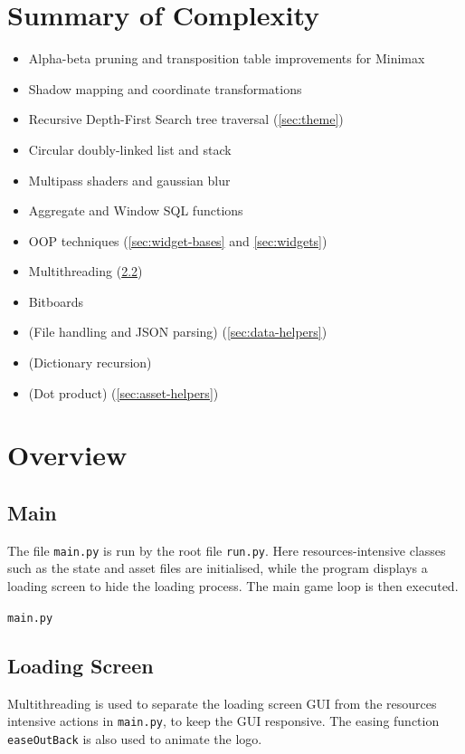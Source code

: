 \documentclass[../main/main.tex]{subfiles}
\begin{document}
\section{Summary of Complexity}
\begin{itemize}
\item Alpha-beta pruning and transposition table improvements for Minimax
\item Shadow mapping and coordinate transformations
\item Recursive Depth-First Search tree traversal (\ref{sec:theme})
\item Circular doubly-linked list and stack
\item Multipass shaders and gaussian blur
\item Aggregate and Window SQL functions
\item OOP techniques (\ref{sec:widget-bases} and \ref{sec:widgets})
\item Multithreading (\ref{sec:loading-screen})
\item Bitboards
\item (File handling and JSON parsing) (\ref{sec:data-helpers})
\item (Dictionary recursion)
\item (Dot product) (\ref{sec:asset-helpers})
\end{itemize}

\section{Overview}
\subsection{Main}
The file \lstinline{main.py} is run by the root file \lstinline{run.py}. Here resources-intensive classes such as the state and asset files are initialised, while the program displays a loading screen to hide the loading process. The main game loop is then executed.

\noindent\verb|main.py|


\subsection{Loading Screen}
\label{sec:loading-screen}
Multithreading is used to separate the loading screen GUI from the resources intensive actions in \lstinline{main.py}, to keep the GUI responsive. The easing function \lstinline{easeOutBack} is also used to animate the logo.
\end{document}

